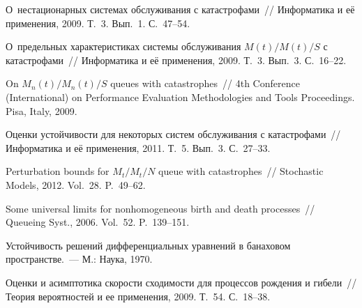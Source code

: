 \begin{multicols}{2}
{{\begin{thebibliography}{99}
О~нестационарных системах обслуживания с катастрофами~// Информатика и её применения, 2009. 
Т.~3. Вып.~1. С.~47--54.

О~предельных характеристиках системы обслуживания $M(t)/M(t)/S$ с катастрофами~// 
Информатика и её применения, 2009. Т.~3. Вып.~3. С.~16--22.

On $M_n(t)/M_n(t)/S$ queues with catastrophes~//  
4th  Conference (International) on Performance Evaluation Methodologies and Tools Proceedings.  
Pisa, Italy, 2009.

Оценки устойчивости для некоторых систем обслуживания с катастрофами~//  
Информатика и её применения, 2011. Т.~5. Вып.~3. С.~27--33.

 Perturbation bounds for $M_t/M_t/N$ queue with
catastrophes~// Stochastic Models, 2012. Vol.~28. P.~49--62.

Some universal limits for nonhomogeneous birth and death processes~// 
Queueing Syst., 2006. Vol.~52. P.~139--151.

 Устойчивость решений
диф\-фе\-рен\-циальных уравнений в банаховом пространстве.~--- М.:
Наука, 1970.

\label{end\stat}

Оценки и асимптотика скорости сходимости для процессов рождения и гибели~// 
Теория вероятностей и ее применения, 2009. Т.~54. С.~18--38.
\end{thebibliography}
}
}


\end{multicols}